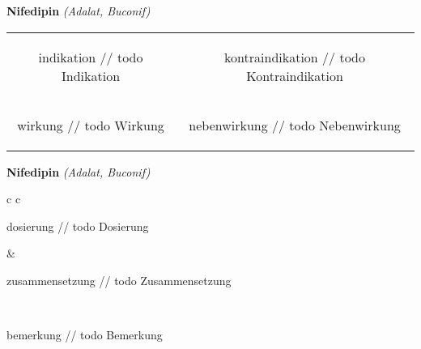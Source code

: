 \documentclass[12pt]{beamer}
\begin{document}
\begin{frame}{
    \textbf{Nifedipin}
    \textit{(Adalat, Buconif)}
}
    \begin{tabular}{c c}
        \begin{beamercolorbox}[wd=\boxwidth\textwidth,ht=\boxheight\textheight,sep=1em]{indikation}
        // todo Indikation
        \end{beamercolorbox} & 
        \begin{beamercolorbox}[wd=\boxwidth\textwidth,ht=\boxheight\textheight,sep=1em]{kontraindikation}
        // todo Kontraindikation 
        \end{beamercolorbox} \\
        \begin{beamercolorbox}[wd=\boxwidth\textwidth,ht=\boxheight\textheight,sep=1em]{wirkung}
        // todo Wirkung
        \end{beamercolorbox} & 
        \begin{beamercolorbox}[wd=\boxwidth\textwidth,ht=\boxheight\textheight,sep=1em]{nebenwirkung}
        // todo Nebenwirkung
        \end{beamercolorbox} \\
    \end{tabular}
\end{frame}

\begin{frame}{
    \textbf{Nifedipin}
    \textit{(Adalat, Buconif)}
}
    \begin{tabular}{c c}
        \begin{beamercolorbox}[wd=\boxwidth\textwidth,ht=\boxheight\textheight,sep=1em]{dosierung}
        // todo Dosierung
        \end{beamercolorbox} & 
        \begin{beamercolorbox}[wd=\boxwidth\textwidth,ht=\boxheight\textheight,sep=1em]{zusammensetzung}
        // todo Zusammensetzung
        \end{beamercolorbox} \\
        \begin{beamercolorbox}[wd=\textwidth,ht=\boxheight\textheight,sep=1em]{bemerkung}
        // todo Bemerkung
        \end{beamercolorbox} \\
    \end{tabular}
\end{frame}
\end{document}
